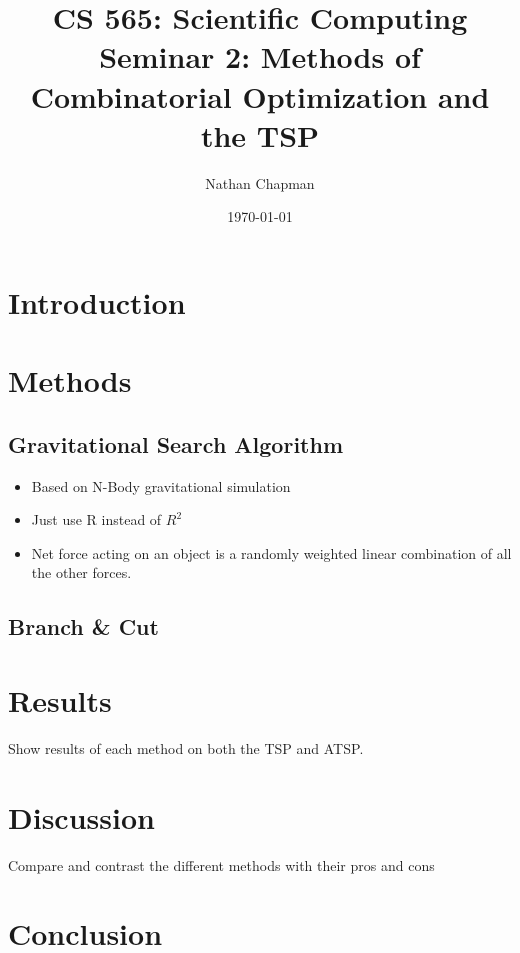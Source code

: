 \documentclass{article}
\title{\vspace*{-0.625in}CS 565: Scientific Computing \\ Seminar 2: Methods of Combinatorial Optimization and the TSP}
\author{Nathan Chapman}
\date{\today}
\begin{document}
    \maketitle

    \section*{Introduction}

    \section*{Methods}

        \subsection*{Gravitational Search Algorithm}

            \begin{itemize}
                \item Based on N-Body gravitational simulation
                \item Just use R instead of $R^2$
                \item Net force acting on an object is a randomly weighted linear combination of all the other forces.
            \end{itemize}

        \subsection*{Branch \& Cut}

    \section*{Results}

        Show results of each method on both the TSP and ATSP.

    \section*{Discussion}

        Compare and contrast the different methods with their pros and cons

    \section*{Conclusion}
\end{document}
